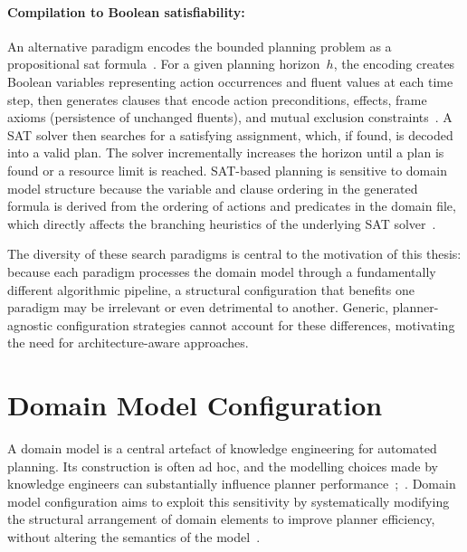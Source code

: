 \paragraph{Compilation to Boolean satisfiability:}
An alternative paradigm encodes the bounded planning problem as a propositional \gls{sat} formula~\cite{KautzSelman1992}.
For a given planning horizon~$h$, the encoding creates Boolean variables representing action occurrences and fluent values at each time step, then generates clauses that encode action preconditions, effects, frame axioms (persistence of unchanged fluents), and mutual exclusion constraints~\cite{Rintanen2012}.
A SAT solver then searches for a satisfying assignment, which, if found, is decoded into a valid plan.
The solver incrementally increases the horizon until a plan is found or a resource limit is reached.
SAT-based planning is sensitive to domain model structure because the variable and clause ordering in the generated formula is derived from the ordering of actions and predicates in the domain file, which directly affects the branching heuristics of the underlying SAT solver~\cite{Rintanen2012}.

The diversity of these search paradigms is central to the motivation of this thesis: because each paradigm processes the domain model through a fundamentally different algorithmic pipeline, a structural configuration that benefits one paradigm may be irrelevant or even detrimental to another.
Generic, planner-agnostic configuration strategies cannot account for these differences, motivating the need for architecture-aware approaches.

\section{Domain Model Configuration}
\label{sec:bg:configuration}

A domain model is a central artefact of knowledge engineering for automated planning.
Its construction is often ad hoc, and the modelling choices made by knowledge engineers can substantially influence planner performance~\cite{McCluskey2017};~\cite{Georgievski2023}.
Domain model configuration aims to exploit this sensitivity by systematically modifying the structural arrangement of domain elements to improve planner efficiency, without altering the semantics of the model~\cite{Vallati2021}.

